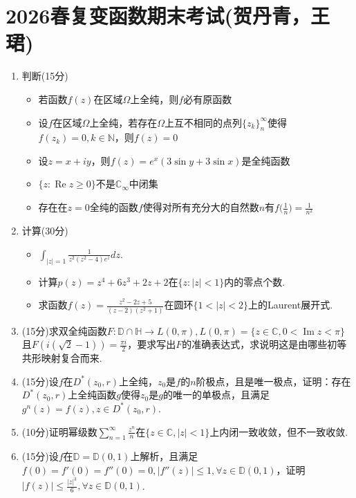 \section{2026春复变函数期末考试(贺丹青，王珺)}
\begin{enumerate}
    \item 判断(15分)\\
    \begin{itemize}
        \item[(1)]若函数$f(z)$在区域$\Omega$上全纯，则$f$必有原函数
        \item[(2)]设$f$在区域$\Omega$上全纯，若存在$\Omega$上互不相同的点列$\{z_k\}_n^{\infty}$使得$f(z_k)=0,k\in\mathbb{N}$，则$f(z)=0$
        \item[(3)]设$z=x+iy$，则$f(z)=e^x(3\sin y+3\sin x)$是全纯函数
        \item[(4)]$\{z:\operatorname{Re} z\geqslant0\}$不是$\mathbb{C}_{\infty}$中闭集
        \item[(5)]存在在$z=0$全纯的函数$f$使得对所有充分大的自然数$n$有$f\big(\frac1n\big)=\frac{1}{n^2}$
    \end{itemize}
    \item 计算(30分)
    \begin{itemize}
        \item[(1)]$\int_{|z|=1}\frac{1}{z^2(z^2-4)e^z}dz$.
        \item[(2)]计算$p(z)=z^4+6z^3+2z+2$在$\{z:|z|<1\}$内的零点个数.
        \item[(3)]求函数$f(z)=\frac{z^2-2z+5}{(z-2)(z^2+1)}$在圆环$\{1<|z|<2\}$上的Laurent展开式.
    \end{itemize}
    \item (15分)求双全纯函数$F:\mathbb{D}\cap\mathbb{H}\to L(0,\pi),L(0,\pi)=\{z\in\mathbb{C},0<\operatorname{Im} z<\pi\}$且$F(i(\sqrt2-1))=\frac{\pi i}{2}$，要求写出$F$的准确表达式，求说明这是由哪些初等共形映射复合而来.
    \item (15分)设$f$在$D^*(z_0,r)$上全纯，$z_0$是$f$的$n$阶极点，且是唯一极点，证明：存在$D^*(z_0,r)$上全纯函数$g$使得$z_0$是$g$的唯一的单极点，且满足$g^n(z)=f(z),z\in D^*(z_0,r)$.
    \item (10分)证明幂级数$\sum_{n=1}^{\infty}\frac{z^n}{n}$在$\{z\in\mathbb{C},|z|<1\}$上内闭一致收敛，但不一致收敛.
    \item (15分)设$f$在$\mathbb{D}=\mathbb{D}(0,1)$上解析，且满足$f(0)=f'(0)=f''(0)=0,|f''(z)|\leqslant 1,\forall z\in \mathbb{D}(0,1)$，证明$|f(z)|\leqslant\frac{|z|^3}{6},\forall z\in\mathbb{D}(0,1)$.
\end{enumerate}

